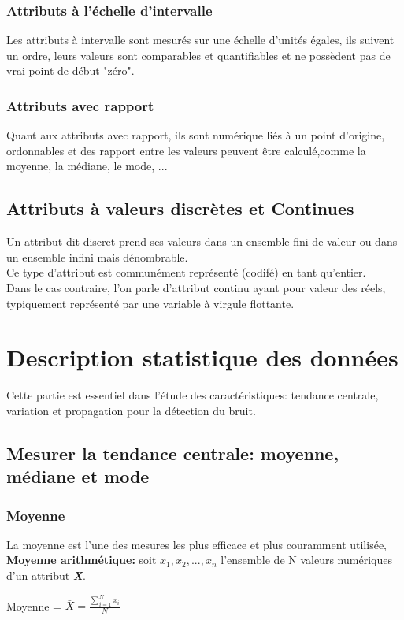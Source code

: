 \documentclass[12pt,a4paper,oneside]{book}
\begin{document}
\subsubsection{Attributs à l'échelle d'intervalle}
Les attributs à intervalle sont mesurés sur une échelle d'unités égales, ils suivent un ordre, leurs valeurs sont comparables et quantifiables et ne possèdent pas de vrai point de début "zéro".

\subsubsection{Attributs avec rapport}
Quant aux attributs avec rapport, ils sont numérique liés à un point d'origine, ordonnables et des rapport entre les valeurs peuvent être calculé,comme la moyenne, la médiane, le mode, ... 

\subsection{Attributs à valeurs discrètes et Continues}
Un attribut dit discret prend ses valeurs dans un ensemble fini de valeur ou dans un ensemble infini mais dénombrable.\\
Ce type d'attribut est communément représenté (codifé) en tant qu'entier.\\
Dans le cas contraire, l'on parle d'attribut continu ayant pour valeur des réels, typiquement représenté par une variable à virgule flottante. 

\section{Description statistique des données}
Cette partie est essentiel dans l'étude des caractéristiques: tendance centrale, variation et propagation pour la détection du bruit.

\subsection{Mesurer la tendance centrale: moyenne, médiane et mode}

\subsubsection{Moyenne}
La moyenne est l'une des mesures les plus efficace et plus couramment utilisée,\\
\textbf{Moyenne arithmétique:}
soit $x_{1}, x_{2}, ... ,x_{n}$ l'ensemble de N valeurs numériques d'un attribut \textit{\textbf{X}}.
\begin{center}
	Moyenne = $\bar{X} = \frac{\sum_{i=1}^{N}{x_{i}}}{N}$
\end{center}
\end{document}

